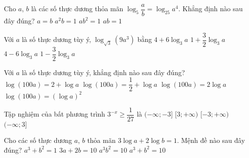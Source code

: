 %

\begin{ex}%
	Cho $a$, $b$ là các số thực dương thỏa mãn $\log_5 \dfrac{a}{b}=\log_{25} a^4$. Khẳng định nào sau đây đúng?
	\choice
	{$a=b$}
	{$a^2 b=1$}
	{$a b^2=1$}
	{\True $a b=1$}
\end{ex}

\begin{ex}%
	Với $a$ là số thực dương tùy ý, $\log_{\sqrt{3}}\left(9a^3\right)$ bằng
	\choice
	{\True $4 + 6\log_3a$}
	{$1 + \dfrac{3}{2}\log_3a$}
	{$4 - 6\log_3a$}
	{$1 - \dfrac{3}{2}\log_3a$}
\end{ex}

\begin{ex}%
	Với $a$ là số thực dương tùy ý, khẳng định nào sau đây đúng?
	\choice
	{\True $\log\left(100a\right)=2+\log a$}
	{$\log\left(100a\right)=\dfrac{1}{2}+\log a$}
	{$\log\left(100a\right)=2\log a$}
	{$\log\left(100a\right)=\left(\log a\right)^2$}
\end{ex}

\begin{ex}%
	Tập nghiệm của bất phương trình $3^{-x} \geq \dfrac{1}{27}$ là
	\choice
	{$(-\infty; -3]$}
	{$[3; +\infty)$}
	{$[-3; +\infty)$}
	{\True $(-\infty; 3]$}
	\loigiai{Ta có $3^{-x} \geq \dfrac{1}{27}\Leftrightarrow 3^{-x}\geq 3^{-3}\Leftrightarrow -x\geq -3\Leftrightarrow x\leq 3.$\\
	Vậy bất phương trình có tập nghiệm $(-\infty; 3]$.
	}
\end{ex}

%

\begin{ex}%
	Cho các số thực dương $a$, $b$ thỏa mãn $3\log a+2\log b=1$. Mệnh đề nào sau đây đúng?
	\choice
	{$a^3+b^2=1$}
	{$3a+2b=10$}
	{\True $a^3b^2=10$}
	{$a^3+b^2=10$}
\end{ex}

